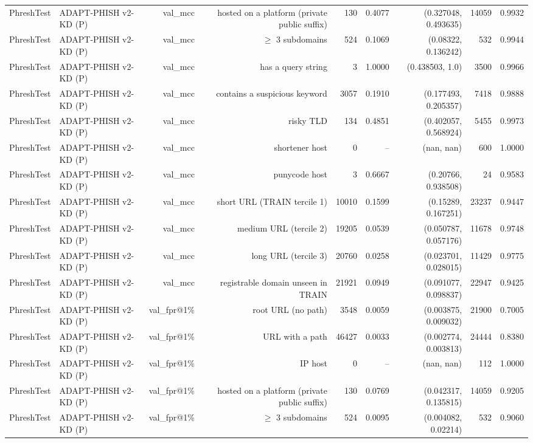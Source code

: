 \begin{table}[t]
\begin{tabular}{llrrrrrrr}
PhreshTest & ADAPT-PHISH v2-KD (P) & val\_mcc & hosted on a platform (private public suffix) & 130 & 0.4077 & (0.327048, 0.493635) & 14059 & 0.9932 \\
PhreshTest & ADAPT-PHISH v2-KD (P) & val\_mcc & $\geq$ 3 subdomains & 524 & 0.1069 & (0.08322, 0.136242) & 532 & 0.9944 \\
PhreshTest & ADAPT-PHISH v2-KD (P) & val\_mcc & has a query string & 3 & 1.0000 & (0.438503, 1.0) & 3500 & 0.9966 \\
PhreshTest & ADAPT-PHISH v2-KD (P) & val\_mcc & contains a suspicious keyword & 3057 & 0.1910 & (0.177493, 0.205357) & 7418 & 0.9888 \\
PhreshTest & ADAPT-PHISH v2-KD (P) & val\_mcc & risky TLD & 134 & 0.4851 & (0.402057, 0.568924) & 5455 & 0.9973 \\
PhreshTest & ADAPT-PHISH v2-KD (P) & val\_mcc & shortener host & 0 & -- & (nan, nan) & 600 & 1.0000 \\
PhreshTest & ADAPT-PHISH v2-KD (P) & val\_mcc & punycode host & 3 & 0.6667 & (0.20766, 0.938508) & 24 & 0.9583 \\
PhreshTest & ADAPT-PHISH v2-KD (P) & val\_mcc & short URL (TRAIN tercile 1) & 10010 & 0.1599 & (0.15289, 0.167251) & 23237 & 0.9447 \\
PhreshTest & ADAPT-PHISH v2-KD (P) & val\_mcc & medium URL (tercile 2) & 19205 & 0.0539 & (0.050787, 0.057176) & 11678 & 0.9748 \\
PhreshTest & ADAPT-PHISH v2-KD (P) & val\_mcc & long URL (tercile 3) & 20760 & 0.0258 & (0.023701, 0.028015) & 11429 & 0.9775 \\
PhreshTest & ADAPT-PHISH v2-KD (P) & val\_mcc & registrable domain unseen in TRAIN & 21921 & 0.0949 & (0.091077, 0.098837) & 22947 & 0.9425 \\
PhreshTest & ADAPT-PHISH v2-KD (P) & val\_fpr@1\% & root URL (no path) & 3548 & 0.0059 & (0.003875, 0.009032) & 21900 & 0.7005 \\
PhreshTest & ADAPT-PHISH v2-KD (P) & val\_fpr@1\% & URL with a path & 46427 & 0.0033 & (0.002774, 0.003813) & 24444 & 0.8380 \\
PhreshTest & ADAPT-PHISH v2-KD (P) & val\_fpr@1\% & IP host & 0 & -- & (nan, nan) & 112 & 1.0000 \\
PhreshTest & ADAPT-PHISH v2-KD (P) & val\_fpr@1\% & hosted on a platform (private public suffix) & 130 & 0.0769 & (0.042317, 0.135815) & 14059 & 0.9205 \\
PhreshTest & ADAPT-PHISH v2-KD (P) & val\_fpr@1\% & $\geq$ 3 subdomains & 524 & 0.0095 & (0.004082, 0.02214) & 532 & 0.9060 \\

\end{tabular}
\end{table}
